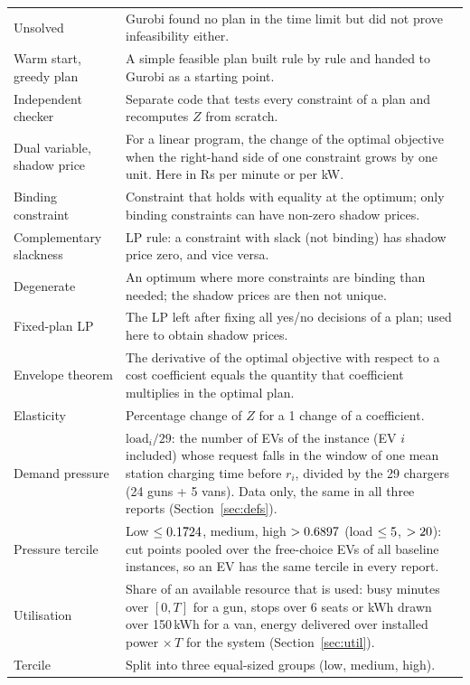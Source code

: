 \begin{xltabular}{\textwidth}{@{}>{\raggedright\arraybackslash}p{4.0cm}X@{}}
Unsolved & Gurobi found no plan in the time limit but did not prove infeasibility either. \\
Warm start, greedy plan & A simple feasible plan built rule by rule and handed to Gurobi as a starting point. \\
Independent checker & Separate code that tests every constraint of a plan and recomputes $Z$ from scratch. \\
Dual variable, shadow price & For a linear program, the change of the optimal objective when the right-hand side of one constraint grows by one unit. Here in Rs per minute or per kW. \\
Binding constraint & Constraint that holds with equality at the optimum; only binding constraints can have non-zero shadow prices. \\
Complementary slackness & LP rule: a constraint with slack (not binding) has shadow price zero, and vice versa. \\
Degenerate & An optimum where more constraints are binding than needed; the shadow prices are then not unique. \\
Fixed-plan LP & The LP left after fixing all yes/no decisions of a plan; used here to obtain shadow prices. \\
Envelope theorem & The derivative of the optimal objective with respect to a cost coefficient equals the quantity that coefficient multiplies in the optimal plan. \\
Elasticity & Percentage change of $Z$ for a 1\pct{} change of a coefficient. \\
Demand pressure & $\text{load}_i/29$: the number of EVs of the instance (EV $i$ included) whose request falls in the window of one mean station charging time before $r_i$, divided by the 29 chargers (24 guns + 5 vans). Data only, the same in all three reports (Section~\ref{sec:defs}). \\
Pressure tercile & Low $\le0.1724$, medium, high $>0.6897$ (load $\le5$, $>20$): cut points pooled over the free-choice EVs of all \NPressPoolInst{} baseline instances, so an EV has the same tercile in every report. \\
Utilisation & Share of an available resource that is used: busy minutes over $[0,T]$ for a gun, stops over 6 seats or kWh drawn over 150\,kWh for a van, energy delivered over installed power $\times\,T$ for the system (Section~\ref{sec:util}). \\
Tercile & Split into three equal-sized groups (low, medium, high). \\

\end{xltabular}
